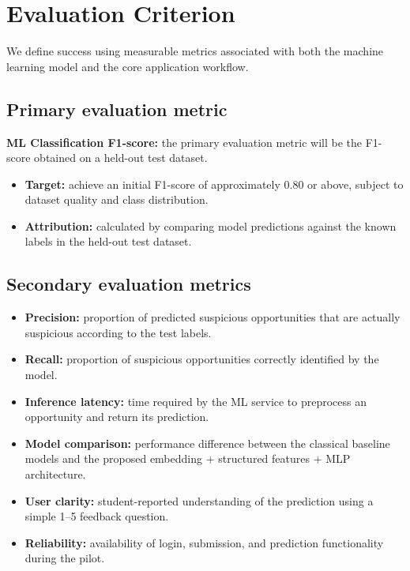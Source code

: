 \documentclass[11pt,a4paper]{article}
\newcommand{\BvrHint}[1]{%
  {\normalfont\normalsize\itshape\hfill #1}}
\begin{document}
\section{Evaluation Criterion%
\BvrHint{}}

We define success using measurable metrics associated with both the
machine learning model and the core application workflow.

\subsection{Primary evaluation metric}

\textbf{ML Classification F1-score:} the primary evaluation metric will be
the F1-score obtained on a held-out test dataset.

\begin{itemize}[leftmargin=0.7cm]

    \item \textbf{Target:} achieve an initial F1-score of approximately
    $0.80$ or above, subject to dataset quality and class distribution.

    \item \textbf{Attribution:} calculated by comparing model predictions
    against the known labels in the held-out test dataset.
\end{itemize}

\subsection{Secondary evaluation metrics}

\begin{itemize}[leftmargin=0.7cm]

    \item \textbf{Precision:} proportion of predicted suspicious
    opportunities that are actually suspicious according to the test labels.

    \item \textbf{Recall:} proportion of suspicious opportunities correctly
    identified by the model.

    \item \textbf{Inference latency:} time required by the ML service to
    preprocess an opportunity and return its prediction.

    \item \textbf{Model comparison:} performance difference between the
    classical baseline models and the proposed embedding + structured
    features + MLP architecture.

    \item \textbf{User clarity:} student-reported understanding of the
    prediction using a simple 1--5 feedback question.

    \item \textbf{Reliability:} availability of login, submission, and
    prediction functionality during the pilot.
\end{itemize}
\end{document}
